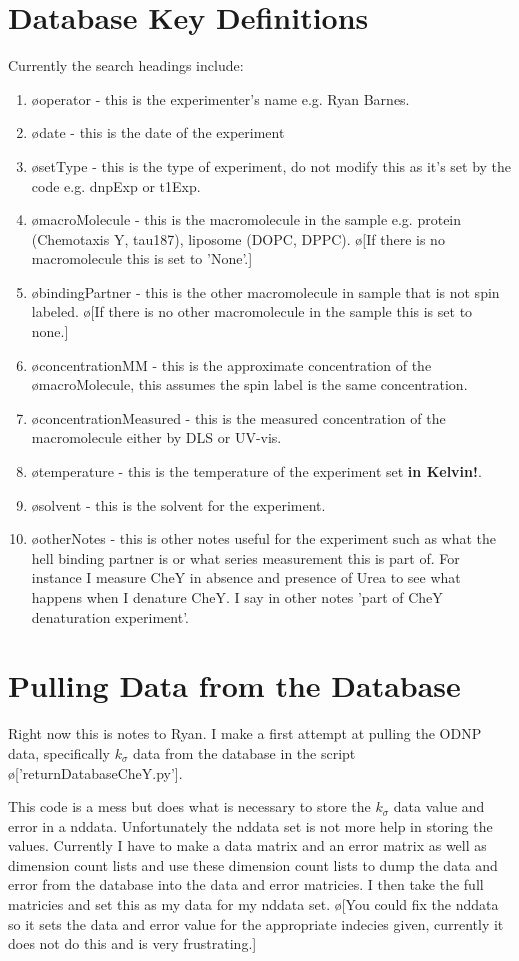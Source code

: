 \documentclass[10pt]{book}
\begin{document}
\section{Database Key Definitions}
Currently the search headings include:
\begin{enumerate}
    \item \o{operator} - this is the experimenter's name e.g. Ryan Barnes.
    \item \o{date} - this is the date of the experiment
    \item \o{setType} - this is the type of experiment, do not modify this as it's set by the code e.g. dnpExp or t1Exp.
    \item \o{macroMolecule} - this is the macromolecule in the sample e.g. protein (Chemotaxis Y, tau187), liposome (DOPC, DPPC). \o[If there is no macromolecule this is set to 'None'.]{} 
    \item \o{bindingPartner} - this is the other macromolecule in sample that is not spin labeled. \o[If there is no other macromolecule in the sample this is set to none.]{} 
    \item \o{concentrationMM} - this is the approximate concentration of the \o{macroMolecule}, this assumes the spin label is the same concentration.
    \item \o{concentrationMeasured} - this is the measured concentration of the macromolecule either by DLS or UV-vis.
    \item \o{temperature} - this is the temperature of the experiment set {\bf in Kelvin!}.
    \item \o{solvent} - this is the solvent for the experiment.
    \item \o{otherNotes} - this is other notes useful for the experiment such as what the hell binding partner is or what series measurement this is part of. For instance I measure CheY in absence and presence of Urea to see what happens when I denature CheY. I say in other notes 'part of CheY denaturation experiment'.
\end{enumerate}
\section{Pulling Data from the Database}

Right now this is notes to Ryan. 
I make a first attempt at pulling the ODNP data, specifically $k_{\sigma}$ data from the database in the script \o['returnDatabaseCheY.py']{}.

This code is a mess but does what is necessary to store the $k_{\sigma}$ data value and error in a nddata. Unfortunately the nddata set is not more help in storing the values. Currently I have to make a data matrix and an error matrix as well as dimension count lists and use these dimension count lists to dump the data and error from the database into the data and error matricies. I then take the full matricies and set this as my data for my nddata set. \o[You could fix the nddata so it sets the data and error value for the appropriate indecies given, currently it does not do this and is very frustrating.]{}
\end{document}
